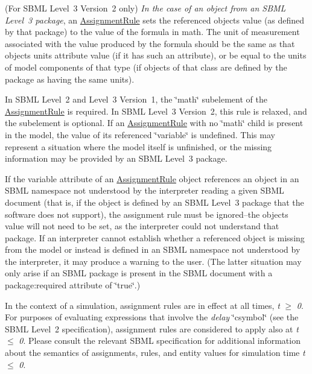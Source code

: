 \begin{DoxyItemize}
\item (For S\+B\+ML Level~3 Version~2 only) {\itshape In the case of an object from an S\+B\+ML Level~3 package}, an \hyperlink{class_assignment_rule}{Assignment\+Rule} sets the referenced object\textquotesingle{}s value (as defined by that package) to the value of the formula in math. The unit of measurement associated with the value produced by the formula should be the same as that object\textquotesingle{}s units attribute value (if it has such an attribute), or be equal to the units of model components of that type (if objects of that class are defined by the package as having the same units).


\end{DoxyItemize}

In S\+B\+ML Level~2 and Level~3 Version~1, the \char`\"{}math\char`\"{} subelement of the \hyperlink{class_assignment_rule}{Assignment\+Rule} is required. In S\+B\+ML Level~3 Version~2, this rule is relaxed, and the subelement is optional. If an \hyperlink{class_assignment_rule}{Assignment\+Rule} with no \char`\"{}math\char`\"{} child is present in the model, the value of its referenced \char`\"{}variable\char`\"{} is undefined. This may represent a situation where the model itself is unfinished, or the missing information may be provided by an S\+B\+ML Level~3 package.

If the variable attribute of an \hyperlink{class_assignment_rule}{Assignment\+Rule} object references an object in an S\+B\+ML namespace not understood by the interpreter reading a given S\+B\+ML document (that is, if the object is defined by an S\+B\+ML Level~3 package that the software does not support), the assignment rule must be ignored--the object\textquotesingle{}s value will not need to be set, as the interpreter could not understand that package. If an interpreter cannot establish whether a referenced object is missing from the model or instead is defined in an S\+B\+ML namespace not understood by the interpreter, it may produce a warning to the user. (The latter situation may only arise if an S\+B\+ML package is present in the S\+B\+ML document with a package\+:required attribute of \char`\"{}true\char`\"{}.)

In the context of a simulation, assignment rules are in effect at all times, {\itshape t} $\geq$ {\itshape 0}. For purposes of evaluating expressions that involve the {\itshape delay} \char`\"{}csymbol\char`\"{} (see the S\+B\+ML Level~2 specification), assignment rules are considered to apply also at {\itshape t} $\leq$ {\itshape 0}. Please consult the relevant S\+B\+ML specification for additional information about the semantics of assignments, rules, and entity values for simulation time {\itshape t} $\leq$ {\itshape 0}.

